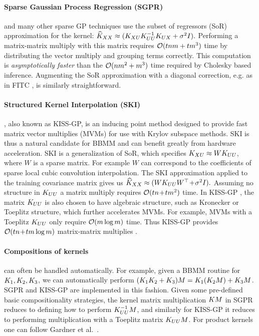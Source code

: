 \paragraph{Sparse Gaussian Process Regression (SGPR)} \cite{titsias2009variational} and many other sparse GP techniques \cite{quinonero2005unifying,snelson2006sparse,hensman2013gaussian} use the subset of regressors (SoR) approximation for the kernel:
$
  \widehat{K}_{XX} \approx (K_{XU}K_{UU}^{-1}K_{UX} + \sigma^{2}I).
$
Performing a matrix-matrix multiply with this matrix requires $\bigo{tnm + tm^{3}}$ time by distributing the vector multiply and grouping terms correctly.
This computation is \emph{asymptotically faster} than the $\bigo{nm^{2} + m^{3}}$ time required by Cholesky based inference. Augmenting the SoR approximation with a diagonal correction, e.g. as in FITC \cite{snelson2006sparse}, is similarly straightforward.

\paragraph{Structured Kernel Interpolation (SKI)} \cite{wilson2015kernel}, also known as KISS-GP, is an inducing point method designed to provide fast matrix vector multiplies (MVMs) for use with Krylov subspace methods. SKI is thus a natural candidate for BBMM and can benefit greatly from hardware acceleration.
SKI is a generalization of SoR, which specifies $K_{XU} \approx WK_{UU}$, where $W$ is a sparse matrix. For example $W$ can correspond to the coefficients of sparse local cubic convolution interpolation.
The SKI approximation applied to the training covariance matrix gives us
$
\widehat{K}_{XX} \approx (WK_{UU}W^{\top} \! + \! \sigma^{2}I).
$
Assuming no structure in $K_{UU}$ a matrix multiply requires $\bigo{tn \! + \! tm^{2}}$ time. In KISS-GP \citep{wilson2015kernel,wilson2015thoughts}, the matrix $K_{UU}$ is also chosen to have algebraic structure, such as Kronecker or Toeplitz structure, which further accelerates MVMs. For example, MVMs with a Toeplitz $K_{UU}$ only require $\bigo{m \log m}$ time. Thus KISS-GP
provides $\bigo{tn \! + \! tm \log m}$ matrix-matrix multiplies \cite{wilson2015kernel}.

\paragraph{Compositions of kernels} can often be handled automatically.
For example, given a BBMM routine for $K_{1},K_{2},K_{3}$, we can automatically perform $(K_{1}K_{2}+K_{3})M = K_{1}(K_{2}M) + K_{3}M$.
SGPR and KISS-GP are implemented in this fashion. Given some pre-defined basic compositionality strategies, the kernel matrix multiplication $KM$ in SGPR reduces to defining how to perform $K_{UU}^{-1}M$, and similarly for KISS-GP it reduces to performing multiplication with a Toeplitz matrix $K_{UU}M$. For product kernels one can follow Gardner et al.~\cite{gardner2018product}.
